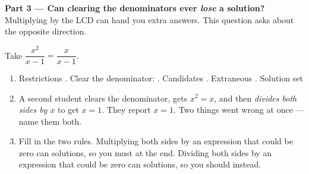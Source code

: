 \documentclass[10pt]{article}
\begin{document}
\begin{tcolorbox}[colback=white, colframe=black!40, title=\textbf{Tier E --- Extension},
    fonttitle=\bfseries, arc=1.5mm, left=3mm, right=3mm, top=2mm, bottom=2mm, breakable]
\vspace{5pt}
\textbf{Part 3 --- Can clearing the denominators ever \emph{lose} a solution?} Multiplying by the LCD
can hand you extra answers. This question asks about the opposite direction.

\vspace{2pt}
Take $\dfrac{x^2}{x-1}=\dfrac{x}{x-1}$.
\begin{enumerate}[label=(\alph*), leftmargin=2.1em, itemsep=5pt]
  \item Restrictions . Clear the denominator: \; . \; Candidates
        . \; Extraneous . \; Solution set 
  \item A second student clears the denominator, gets $x^2=x$, and then \emph{divides both sides by
        $x$} to get $x=1$. They report $x=1$. Two things went wrong at once --- name them both.
  \item Fill in the two rules. Multiplying both sides by an expression that could be zero can
         solutions, so you must  at the end. Dividing both sides by an
        expression that could be zero can  solutions, so you should
         instead.
\end{enumerate}
\end{tcolorbox}
\end{document}
